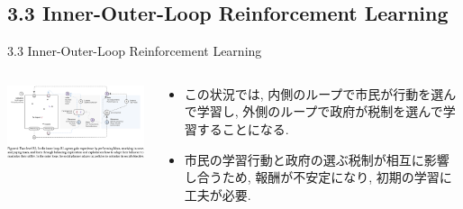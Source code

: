 \documentclass[unicode,aspectratio=169,11pt]{beamer}
\begin{document}
\subsection{3.3 Inner-Outer-Loop Reinforcement Learning}
\begin{frame}{3.3 Inner-Outer-Loop Reinforcement Learning}{}
    \begin{columns}[t]
        \begin{column}[]{0.6\textwidth}
            \begin{center}
                \includegraphics[width=9cm]{figure6.png}
            \end{center}
        \end{column}
        \begin{column}[]{0.4\textwidth}
            \begin{itemize}
                \item この状況では, 内側のループで市民が行動を選んで学習し, 外側のループで政府が税制を選んで学習することになる.
                \item 市民の学習行動と政府の選ぶ税制が相互に影響し合うため, 報酬が不安定になり, 初期の学習に工夫が必要.
            \end{itemize}
        \end{column}
    \end{columns}
\end{frame}

\end{document}
